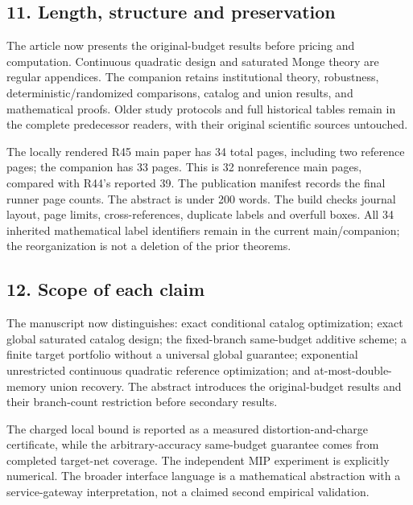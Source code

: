 \documentclass[11pt,letterpaper]{article}
\begin{document}
\subsection*{11. Length, structure and preservation}


The article now presents the original-budget results before pricing and computation. Continuous quadratic design and saturated Monge theory are regular appendices. The companion retains institutional theory, robustness, deterministic/randomized comparisons, catalog and union results, and mathematical proofs. Older study protocols and full historical tables remain in the complete predecessor readers, with their original scientific sources untouched.



The locally rendered R45 main paper has 34 total pages, including two reference pages; the companion has 33 pages. This is 32 nonreference main pages, compared with R44's reported 39. The publication manifest records the final runner page counts. The abstract is under 200 words. The build checks journal layout, page limits, cross-references, duplicate labels and overfull boxes. All 34 inherited mathematical label identifiers remain in the current main/companion; the reorganization is not a deletion of the prior theorems.



\subsection*{12. Scope of each claim}


The manuscript now distinguishes: exact conditional catalog optimization; exact global saturated catalog design; the fixed-branch same-budget additive scheme; a finite target portfolio without a universal global guarantee; exponential unrestricted continuous quadratic reference optimization; and at-most-double-memory union recovery. The abstract introduces the original-budget results and their branch-count restriction before secondary results.



The charged local bound is reported as a measured distortion-and-charge certificate, while the arbitrary-accuracy same-budget guarantee comes from completed target-net coverage. The independent MIP experiment is explicitly numerical. The broader interface language is a mathematical abstraction with a service-gateway interpretation, not a claimed second empirical validation.
\end{document}
